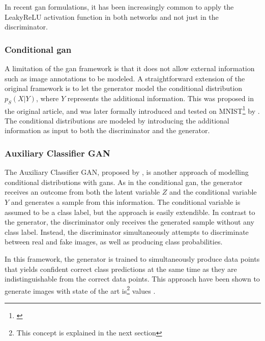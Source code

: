 In recent \acrshort{gan} formulations, it has been increasingly common to apply the LeakyReLU activation function in both networks and not just in the discriminator. 

\subsubsection{Conditional \acrshort{gan}}
A limitation of the \acrshort{gan} framework is that it does not allow external information such as image annotations to be modeled. A straightforward extension of the original framework is to let the generator model the conditional distribution $p_S(X|Y)$, where $Y$ represents the additional information. This was proposed in the original article, and was later formally introduced and tested on MNIST\footnote{\textcite{lecun2010mnist}} by \textcite{mirza2014conditional}. The conditional distributions are modeled by introducing the additional information as input to both the discriminator and the generator.


\subsubsection{Auxiliary Classifier GAN}
The Auxiliary Classifier GAN, proposed by \textcite{odena2016conditional}, is another approach of modelling conditional distributions with \acrshort{gans}. As in the conditional \acrshort{gan}, the generator receives an outcome from both the latent variable $Z$ and the conditional variable $Y$ and generates a sample from this information. The conditional variable is assumed to be a class label, but the approach is easily extendible. In contrast to the generator, the discriminator only receives the generated sample without any class label. Instead, the discriminator simultaneously attempts to discriminate between real and fake images, as well as producing class probabilities.

In this framework, the generator is trained to simultaneously produce data points that yields confident correct class predictions at the same time as they are indistinguishable from the correct data points. This approach have been shown to generate images with state of the art \acrlong{is}\footnote{This concept is explained in the next section} values \parencite{odena2016conditional}.


